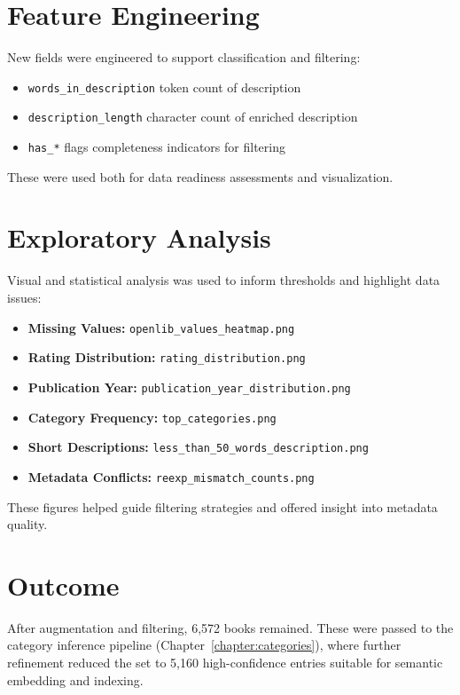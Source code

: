 \section{Feature Engineering}
New fields were engineered to support classification and filtering:
\begin{itemize}
\item \verb|words_in_description| \textemdash{} token count of description
\item \verb|description_length| \textemdash{} character count of enriched description
\item \verb|has_*| flags \textemdash{} completeness indicators for filtering
\end{itemize}
These were used both for data readiness assessments and visualization.

\section{Exploratory Analysis}
Visual and statistical analysis was used to inform thresholds and highlight data issues:
\begin{itemize}
\item \textbf{Missing Values:} \verb|openlib_values_heatmap.png|
\item \textbf{Rating Distribution:} \verb|rating_distribution.png|
\item \textbf{Publication Year:} \verb|publication_year_distribution.png|
\item \textbf{Category Frequency:} \verb|top_categories.png|
\item \textbf{Short Descriptions:} \verb|less_than_50_words_description.png|
\item \textbf{Metadata Conflicts:} \verb|reexp_mismatch_counts.png|
\end{itemize}
These figures helped guide filtering strategies and offered insight into metadata quality.

\section{Outcome}
After augmentation and filtering, 6,572 books remained. These were passed to the category inference pipeline (Chapter~\ref{chapter:categories}), where further refinement reduced the set to 5,160 high-confidence entries suitable for semantic embedding and indexing.